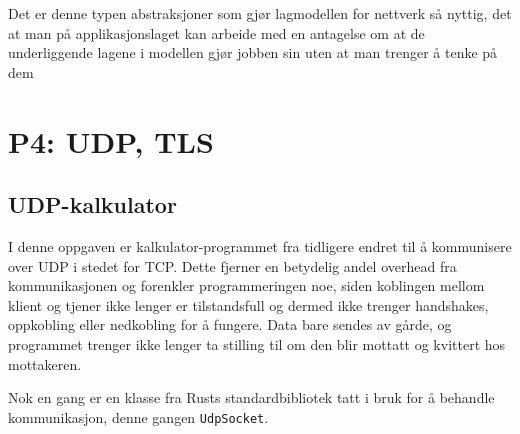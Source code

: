 \documentclass{article}
\newcommand{\code}[1]{\colorbox{light-gray}{\texttt{#1}}}
\begin{document}
Det er denne typen abstraksjoner som gjør lagmodellen for nettverk så nyttig, det at man på applikasjonslaget kan arbeide med en antagelse om at de underliggende lagene i modellen gjør jobben sin uten at man trenger å tenke på dem 

\section{P4: UDP, TLS}

\subsection{UDP-kalkulator}

I denne oppgaven er kalkulator-programmet fra tidligere endret til å kommunisere over UDP i stedet for TCP. Dette fjerner en betydelig andel overhead fra kommunikasjonen og forenkler programmeringen noe, siden koblingen mellom klient og tjener ikke lenger er tilstandsfull og dermed ikke trenger handshakes, oppkobling eller nedkobling for å fungere. Data bare sendes av gårde, og programmet trenger ikke lenger ta stilling til om den blir mottatt og kvittert hos mottakeren.

Nok en gang er en klasse fra Rusts standardbibliotek tatt i bruk for å behandle kommunikasjon, denne gangen \code{UdpSocket}.
\end{document}
